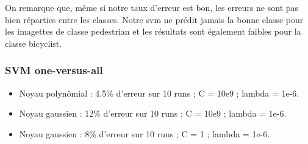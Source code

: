 		On remarque que, même si notre taux d'erreur est bon, les erreurs ne sont pas bien réparties entre les classes. Notre svm ne prédit jamais la bonne classe pour les imagettes de classe pedestrian et les résultats sont également faibles pour la classe bicyclist.

		\subsubsection{SVM one-versus-all}
			\begin{itemize}
				\item Noyau polynômial : 4.5\% d'erreur sur 10 runs ; C = 10e9 ; lambda = 1e-6.
				\item Noyau gaussien : 12\% d'erreur sur 10 runs ; C = 10e9 ; lambda = 1e-6.
				\item Noyau gaussien : 8\% d'erreur sur 10 runs ; C = 1 ; lambda = 1e-6.
			\end{itemize}